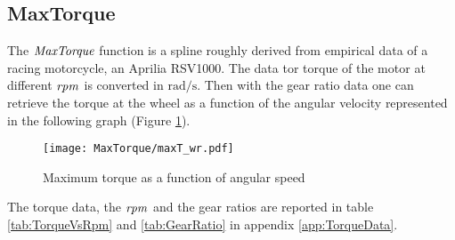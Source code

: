 \subsection{MaxTorque}
\label{subsec:MaxT}
%
The ${\it MaxTorque}$ function is a spline roughly derived from empirical data of a racing motorcycle, an Aprilia RSV1000. The data tor torque of the motor at different $\it rpm$ is converted in $\si{\radian/\second}$. Then with the gear ratio data one can retrieve the torque at the wheel as a function of the angular velocity represented in the following graph (Figure \ref{fig:MaxTorque}).\\
%
\begin{figure}[htb]
    \centering
    \texttt{[image: MaxTorque/maxT\_wr.pdf]}
    \caption{Maximum torque as a function of angular speed}
    \label{fig:MaxTorque}
\end{figure}
%
The torque data, the $\it rpm$ and the gear ratios are reported in table \ref{tab:TorqueVsRpm} and \ref{tab:GearRatio} in appendix \ref{app:TorqueData}. 



